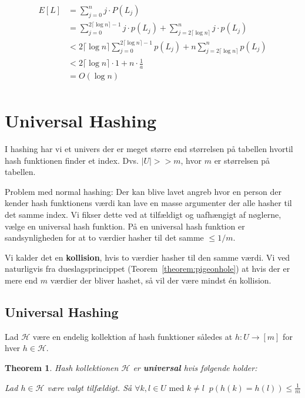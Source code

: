 \documentclass[11pt]{article}
\newtheorem{theorem}{Theorem}
\theoremstyle{definition}
\theoremstyle{remark}
\begin{document}
\begin{equation}
\begin{split}
  E[L] &= \sum_{j=0}^{n} j \cdot P(L_{j}) \\
       &=  \sum_{j=0}^{2 \lceil \log n \rceil - 1}j \cdot p(L_{j}) + \sum_{j= 2 \lceil \log n \rceil}^{n} j \cdot p(L_{j}) \\
       &< 2 \lceil \log n \rceil \sum_{j=0}^{2 \lceil \log n \rceil - 1} p(L_{j}) + n \sum_{j=2 \lceil \log n \rceil}^{n} p(L_{j}) \\
       &< 2 \lceil \log n \rceil \cdot 1 + n \cdot \frac{1}{a}\\
       &= O(\log n)\\
\end{split}
\end{equation}


\newpage

\section{Universal Hashing}
\label{sec:hashing}


I hashing har vi et univers der er meget større end størrelsen på tabellen hvortil hash funktionen finder et index. Dvs. $|U| >> m$, hvor $m$ er størrelsen på tabellen.

Problem med normal hashing: Der kan blive lavet angreb hvor en person der kender hash funktionens værdi kan lave en masse argumenter der alle hasher til det samme index. Vi fikser dette ved at tilfældigt og uafhængigt af nøglerne, vælge en universal hash funktion. På en universal hash funktion er sandsynligheden for at to værdier hasher til det samme $\leq 1/m$.

Vi kalder det en \textbf{kollision}, hvis to værdier hasher til den samme værdi. Vi ved naturligvis fra dueslagsprincippet (Teorem~\ref{theorem:pigeonhole}) at hvis der er mere end $m$ værdier der bliver hashet, så vil der være mindst én kollision. 


\subsection{Universal Hashing}

Lad $\mathcal{H}$ være en endelig kollektion af hash funktioner således at $h : U \rightarrow [m]$  for hver $h \in \mathcal{H}$.

\begin{theorem}
  Hash kollektionen $\mathcal{H}$ er \textbf{universal} hvis følgende holder:

  Lad $h \in \mathcal{H}$ være valgt tilfældigt. Så $\forall k, l \in U \text{ med } k \neq l \; \; p(h(k) = h(l)) \leq \frac{1}{m}$
  \end{theorem}
\end{document}
